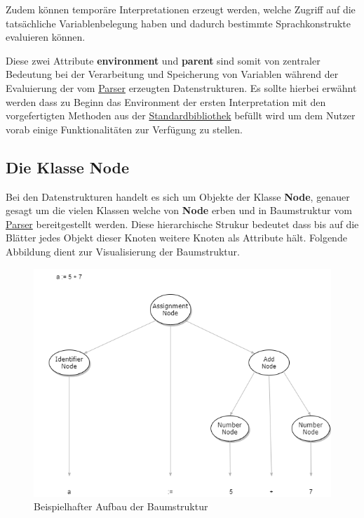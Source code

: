 Zudem können temporäre Interpretationen erzeugt werden, welche Zugriff auf die tatsächliche Variablenbelegung haben und dadurch bestimmte Sprachkonstrukte evaluieren können. 

Diese zwei Attribute \textbf{environment} und \textbf{parent} sind somit von zentraler Bedeutung bei der Verarbeitung und Speicherung von Variablen während der Evaluierung der vom \underline{Parser} erzeugten Datenstrukturen.
Es sollte hierbei erwähnt werden dass zu Beginn das Environment der ersten Interpretation mit den vorgefertigten Methoden aus der \underline{Standardbibliothek} befüllt wird um dem Nutzer vorab einige Funktionalitäten zur Verfügung zu stellen.


\subsection{Die Klasse Node}
\label{Node}
Bei den Datenstrukturen handelt es sich um Objekte der Klasse \textbf{Node}, genauer gesagt um die vielen Klassen welche von \textbf{Node} erben und in Baumstruktur vom \underline{Parser} bereitgestellt werden. Diese hierarchische Strukur bedeutet dass bis auf die Blätter jedes Objekt dieser Knoten weitere Knoten als Attribute hält. Folgende Abbildung dient zur Visualisierung der Baumstruktur. 
\begin{figure}[H]
\centering
	\includegraphics[width=1.0\textwidth]{images/InterpreterExample.png}\par\vspace{0.5cm}
	\caption{Beispielhafter Aufbau der Baumstruktur}
	\label{fig:tree structure}
\end{figure}

